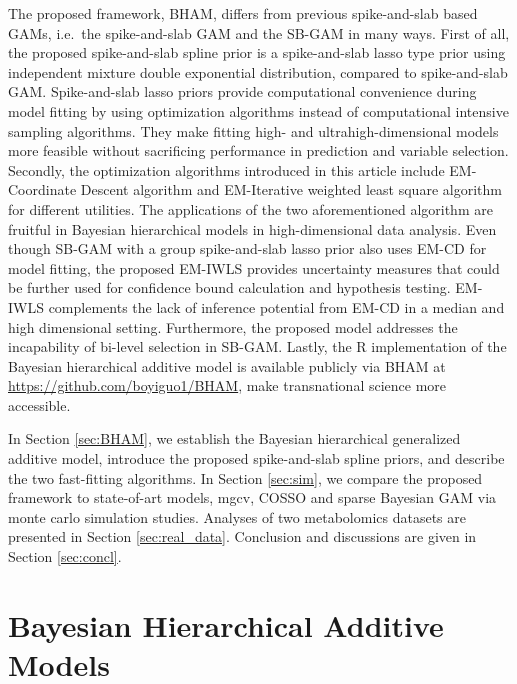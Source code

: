 \documentclass[AMA,STIX1COL,]{WileyNJD-v2}
\begin{document}
The proposed framework, BHAM, differs from previous spike-and-slab based
GAMs, i.e.~the spike-and-slab GAM \citep{Scheipl2012} and the SB-GAM
\citep{Bai2021} in many ways. First of all, the proposed spike-and-slab
spline prior is a spike-and-slab lasso type prior using independent
mixture double exponential distribution, compared to spike-and-slab GAM.
Spike-and-slab lasso priors provide computational convenience during
model fitting by using optimization algorithms instead of computational
intensive sampling algorithms. They make fitting high- and
ultrahigh-dimensional models more feasible without sacrificing
performance in prediction and variable selection. Secondly, the
optimization algorithms introduced in this article include EM-Coordinate
Descent algorithm and EM-Iterative weighted least square algorithm for
different utilities. The applications of the two aforementioned
algorithm are fruitful in Bayesian hierarchical models in
high-dimensional data analysis.
\citep{Yi2012, Rockova2014a, Rockova2018} Even though SB-GAM with a
group spike-and-slab lasso prior also uses EM-CD for model fitting, the
proposed EM-IWLS provides uncertainty measures that could be further
used for confidence bound calculation and hypothesis testing. EM-IWLS
complements the lack of inference potential from EM-CD in a median and
high dimensional setting. Furthermore, the proposed model addresses the
incapability of bi-level selection in SB-GAM. Lastly, the R
implementation of the Bayesian hierarchical additive model is available
publicly via BHAM at \url{https://github.com/boyiguo1/BHAM}, make
transnational science more accessible.

In Section \ref{sec:BHAM}, we establish the Bayesian hierarchical
generalized additive model, introduce the proposed spike-and-slab spline
priors, and describe the two fast-fitting algorithms. In Section
\ref{sec:sim}, we compare the proposed framework to state-of-art models,
mgcv, COSSO and sparse Bayesian GAM via monte carlo simulation studies.
Analyses of two metabolomics datasets are presented in Section
\ref{sec:real_data}. Conclusion and discussions are given in Section
\ref{sec:concl}.

\hypertarget{bayesian-hierarchical-additive-models}{%
\section{Bayesian Hierarchical Additive
Models}\label{bayesian-hierarchical-additive-models}}

\label{sec:BHAM}
\end{document}
